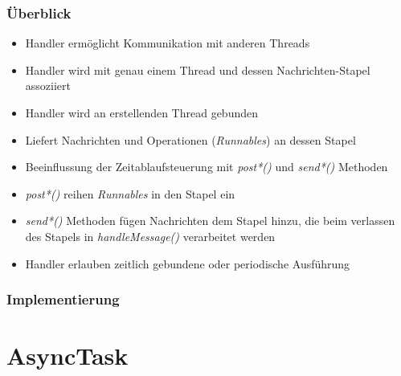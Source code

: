 \begin{frame}
   \frametitle{Überblick}
   \begin{itemize}
     	\item Handler ermöglicht Kommunikation mit anderen Threads
     	\item Handler wird mit genau einem Thread und dessen Nachrichten-Stapel 
			assoziiert
		\item Handler wird an erstellenden Thread gebunden
		\item Liefert Nachrichten und Operationen (\emph{Runnables}) 
			an dessen Stapel
		\item Beeinflussung der Zeitablaufsteuerung mit \emph{post*()} und \emph{send*()} 
			Methoden
		\item \emph{post*()} reihen \emph{Runnables} in den Stapel ein
		\item \emph{send*()} Methoden fügen Nachrichten dem Stapel hinzu, 
			die beim verlassen des Stapels in \emph{handleMessage()} verarbeitet werden
     	\item Handler erlauben zeitlich gebundene oder periodische 
     		Ausführung
   \end{itemize}
\end{frame}

\begin{frame}
   \frametitle{Implementierung}
	
\end{frame}

\section{AsyncTask}

